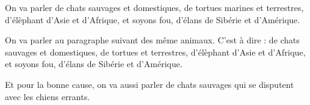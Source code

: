 \documentclass{article}
\begin{document}
\beginnumbering
\autopar

On va parler de 
chats sauvages et domestiques,
de tortues marines et terrestres,
d'élèphant d'Asie et d'Afrique,
et soyons fou, d'élans de Sibérie et d'Amérique.


On va parler au paragraphe suivant des même animaux. C'est à dire : de 
chats sauvages et domestiques,
de tortues  et terrestres,
d'élèphant d'Asie et d'Afrique,
et soyons fou, d'élans de Sibérie et d'Amérique.

\endnumbering
\newpage
\beginnumbering

\autopar Et pour la bonne cause, on va aussi parler de chats sauvages qui se disputent avec les chiens errants.


\endnumbering

\printindex[animal]
\end{document}
